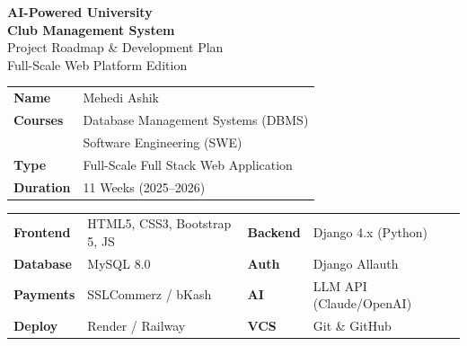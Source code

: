 \documentclass[12pt,a4paper]{article}
\begin{document}
\begin{titlepage}
\centering
\vspace*{1.5cm}
\colorbox{primary}{\parbox{\linewidth}{\centering\vspace{1cm}
  {\color{white}\fontsize{28}{34}\bfseries AI-Powered University}\\[0.4em]
  {\color{white}\fontsize{28}{34}\bfseries Club Management System}\\[0.8em]
  {\color{lightbg}\Large Project Roadmap \& Development Plan}\\[0.6em]
  {\color{gray!40}\normalsize Full-Scale Web Platform Edition}
  \vspace{1cm}}}

\vspace{1.5cm}

\begin{tcolorbox}[colback=lightbg, colframe=accent, width=0.72\linewidth,
  rounded corners, boxrule=1.2pt, title=\textbf{\color{white}Student Information},
  colbacktitle=accent, coltitle=white]
  \renewcommand{\arraystretch}{1.3}
  \begin{tabular}{@{}ll@{}}
    \textbf{Name}     & Mehedi Ashik \\
    \textbf{Courses}  & Database Management Systems (DBMS) \\
                      & Software Engineering (SWE) \\
    \textbf{Type}     & Full-Scale Full Stack Web Application \\
    \textbf{Duration} & 11 Weeks (2025--2026) \\
  \end{tabular}
\end{tcolorbox}

\vspace{1cm}

\begin{tcolorbox}[colback=primary!4, colframe=primary, width=0.88\linewidth,
  rounded corners, boxrule=1pt, title=\textbf{\color{white}Technology Stack},
  colbacktitle=primary, coltitle=white]
  \renewcommand{\arraystretch}{1.3}
  \begin{tabular}{llll}
    \textbf{Frontend}  & HTML5, CSS3, Bootstrap 5, JS
      & \textbf{Backend}  & Django 4.x (Python) \\
    \textbf{Database}  & MySQL 8.0
      & \textbf{Auth}     & Django Allauth \\
    \textbf{Payments}  & SSLCommerz / bKash
      & \textbf{AI}       & LLM API (Claude/OpenAI) \\
    \textbf{Deploy}    & Render / Railway
      & \textbf{VCS}      & Git \& GitHub \\
  \end{tabular}
\end{tcolorbox}


\end{titlepage}
\end{document}
